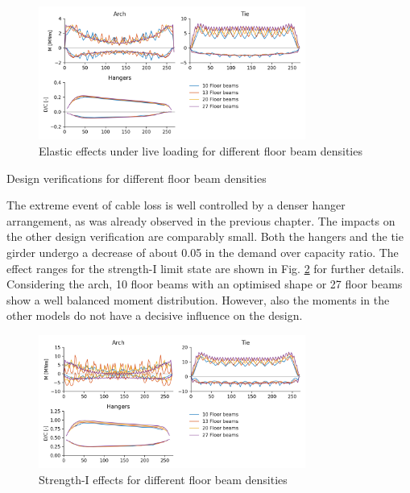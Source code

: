 \begin{figure}
    \centering
    \includegraphics[trim={0 0.4cm 0 0.4cm},clip, width=0.78\textwidth]{calculations/floor beam comparison/live loading.png}
    \caption{Elastic effects under live loading for different floor beam densities}
    \label{fig:fb_live}
\end{figure}

\begin{table}[H]
    \centering
    \resizebox{\columnwidth}{!}{%
    
    }
    \caption{Design verifications for different floor beam densities}
    \label{tab:fb_dc}
\end{table}

The extreme event of cable loss is well controlled by a denser hanger arrangement, as was already observed in the previous chapter. The impacts on the other design verification are comparably small. Both the hangers and the tie girder undergo a decrease of about 0.05 in the demand over capacity ratio. The effect ranges for the strength-I limit state are shown in Fig. \ref{fig:fb_strength} for further details. Considering the arch, 10 floor beams with an optimised shape or 27 floor beams show a well balanced moment distribution. However, also the moments in the other models do not have a decisive influence on the design.

\begin{figure}[H]
    \centering
    \includegraphics[trim={0 0.4cm 0 0.4cm},clip, width=0.78\textwidth]{calculations/floor beam comparison/strength-I.png}
    \caption{Strength-I effects for different floor beam densities}
    \label{fig:fb_strength}
\end{figure}

